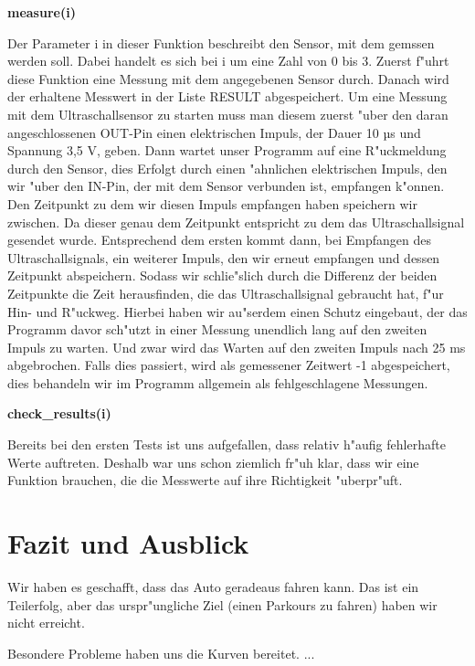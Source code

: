 \documentclass[a4paper,12pt]{article}
\begin{document}
\textbf{measure(i)}

Der Parameter i in dieser Funktion beschreibt den Sensor, mit dem gemssen werden soll.
Dabei handelt es sich bei i um eine Zahl von 0 bis 3.
Zuerst f"uhrt diese Funktion eine Messung mit dem angegebenen Sensor durch.
Danach wird der erhaltene Messwert in der Liste RESULT abgespeichert.
Um eine Messung mit dem Ultraschallsensor zu starten muss man diesem zuerst "uber den daran angeschlossenen OUT-Pin einen elektrischen Impuls, der Dauer 10 µs und Spannung 3,5 V, geben.
Dann wartet unser Programm auf eine R"uckmeldung durch den Sensor, dies Erfolgt durch einen "ahnlichen elektrischen Impuls, den wir "uber den IN-Pin, der mit dem Sensor verbunden ist, empfangen k"onnen.
Den Zeitpunkt zu dem wir diesen Impuls empfangen haben speichern wir zwischen.
Da dieser genau dem Zeitpunkt entspricht zu dem das Ultraschallsignal gesendet wurde.
Entsprechend dem ersten kommt dann, bei Empfangen des Ultraschallsignals, ein weiterer Impuls, den wir erneut empfangen und dessen Zeitpunkt abspeichern.
Sodass wir schlie"slich durch die Differenz der beiden Zeitpunkte die Zeit herausfinden, die das Ultraschallsignal gebraucht hat, f"ur Hin- und R"uckweg.
Hierbei haben wir au"serdem einen Schutz eingebaut, der das Programm davor sch"utzt in einer Messung unendlich lang auf den zweiten Impuls zu warten.
Und zwar wird das Warten auf den zweiten Impuls nach 25 ms abgebrochen.
Falls dies passiert, wird als gemessener Zeitwert -1 abgespeichert, dies behandeln wir im Programm allgemein als fehlgeschlagene Messungen.

\medskip

\textbf{check\_results(i)}

Bereits bei den ersten Tests ist uns aufgefallen, dass relativ h"aufig fehlerhafte Werte auftreten.
Deshalb war uns schon ziemlich fr"uh klar, dass wir eine Funktion brauchen, die die Messwerte auf ihre Richtigkeit "uberpr"uft.

\section{Fazit und Ausblick}\label{sec3}

Wir haben es geschafft, dass das Auto geradeaus fahren kann.
Das ist ein Teilerfolg, aber das urspr"ungliche Ziel (einen Parkours zu fahren) haben wir nicht erreicht.

Besondere Probleme haben uns die Kurven bereitet. ...
\end{document}
